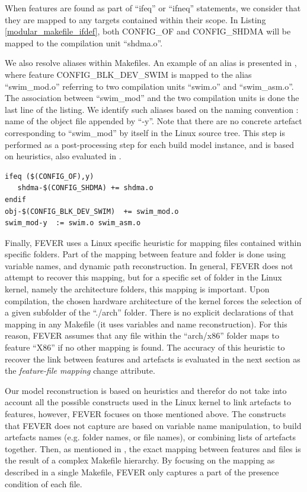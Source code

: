 When features are found as part of ``ifeq'' or ``ifneq'' statements, we consider that they are mapped to any targets contained within their scope.
In Listing \ref{modular_makefile_ifdef}, both CONFIG\_OF and CONFIG\_SHDMA will be mapped to the compilation unit ``shdma.o''.

We also resolve aliases within Makefiles.
An example of an alias is presented in , 
where feature CONFIG\_BLK\_DEV\_SWIM is mapped to the alias ``swim\_mod.o'' referring to two compilation units ``swim.o'' and ``swim\_asm.o''.
The association between ``swim\_mod'' and the two compilation units is done the last line of the listing.
We identify such aliases based on the naming convention : name of the object file appended by ``-y''.
Note that there are no concrete artefact corresponding to ``swim\_mod'' by itself in the Linux source tree.
This step is performed as a post-processing step for each build model instance, 
and is based on heuristics, also evaluated in .

\begin{lstlisting}[language=diff, caption=Example of an ``ifeq'' statement and aliases used in Makefiles, label=modular_makefile_ifdef]
ifeq ($(CONFIG_OF),y)
   shdma-$(CONFIG_SHDMA) += shdma.o
endif
obj-$(CONFIG_BLK_DEV_SWIM)	+= swim_mod.o
swim_mod-y	:= swim.o swim_asm.o
\end{lstlisting}

Finally, FEVER uses a Linux specific heuristic for mapping files contained within specific folders.
Part of the mapping between feature and folder is done using variable names, and dynamic path reconstruction.
In general, FEVER does not attempt to recover this mapping, but for a specific set of folder in the Linux kernel, namely the architecture folders,
this mapping is important.
Upon compilation, the chosen hardware architecture of the kernel forces the selection of a given subfolder of the ``./arch'' folder.
There is no explicit declarations of that mapping in any Makefile (it uses variables and name reconstruction).
For this reason, FEVER assumes that any file within the ``arch/x86'' folder maps to feature ``X86'' if no other mapping is found.
The accuracy of this heuristic to recover the link between features and artefacts is evaluated in the next section
as the \textit{feature-file mapping} change attribute.

Our model reconstruction is based on heuristics and therefor do not take into account all the possible constructs used in the Linux kernel to link artefacts to features, however, FEVER focuses on those mentioned above.
The constructs that FEVER does not capture are based on variable name manipulation, to build artefacts names (e.g. folder names, or file names),
or combining lists of artefacts together.
Then, as mentioned in , the exact mapping between features and files
is the result of a complex Makefile hierarchy. 
By focusing on the mapping as described in a single Makefile, FEVER only captures a part of the presence condition
of each file.

